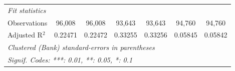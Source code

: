 \begin{tabular}{lcccccc}
   \midrule
   \emph{Fit statistics}\\
   Observations                 & 96,008          & 96,008          & 93,643         & 93,643         & 94,760          & 94,760\\  
   Adjusted R$^2$               & 0.22471         & 0.22472         & 0.33255        & 0.33256        & 0.05845         & 0.05842\\  
   \midrule \midrule
   \multicolumn{7}{l}{\emph{Clustered (Bank) standard-errors in parentheses}}\\
   \multicolumn{7}{l}{\emph{Signif. Codes: ***: 0.01, **: 0.05, *: 0.1}}\\
\end{tabular}
\par\endgroup


